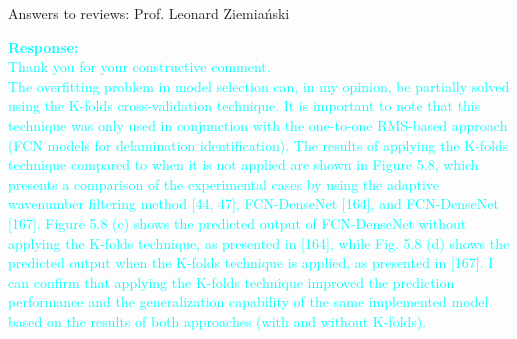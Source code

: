 \documentclass[10pt,aspectratio=169,dvipsnames]{beamer} %
\begin{document}
\begin{frame}{Answers to reviews: Prof. Leonard Ziemiański}
\begin{itemize}
{			\textcolor{Cyan}{
				\textbf{Response:} \\
				Thank you for your constructive comment. \\
				The overfitting problem in model selection can, in my opinion, be partially solved using the K-folds cross-validation technique.
				It is important to note that this technique was only used in conjunction with the one-to-one RMS-based approach (FCN models for delamination identification).
				The results of applying the K-folds technique compared to when it is not applied are shown in Figure 5.8, which presents a comparison of the experimental cases by using the adaptive wavenumber filtering method [44, 47], FCN-DenseNet [164], and FCN-DenseNet [167].
				Figure 5.8 (c) shows the predicted output of FCN-DenseNet without applying the K-folds technique, as presented in [164], while Fig. 5.8 (d) shows the predicted output when the K-folds technique is applied, as presented in [167].
				I can confirm that applying the K-folds technique improved the prediction performance and the generalization capability of the same implemented model based on the results of both approaches (with and without K-folds).
			}}
			
			
\end{itemize}
\end{frame}
\end{document}
